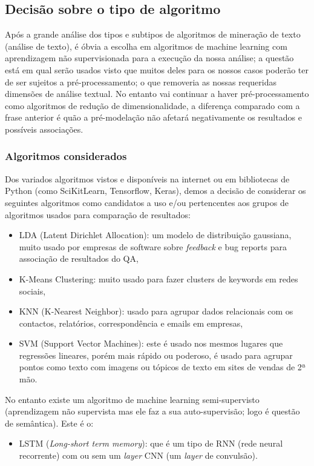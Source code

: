 \documentclass[a4paper,10pt]{article}
\begin{document}
\subsection{Decisão sobre o tipo de algoritmo}

Após a grande análise dos tipos e subtipos de algoritmos de mineração de texto (análise de texto), é óbvia a escolha em algoritmos de machine learning com aprendizagem não supervisionada para a execução da nossa análise; a questão está em qual serão usados visto que muitos deles para os nossos casos poderão ter de ser sujeitos a pré-processamento; o que removeria as nossas requeridas dimensões de análise textual.
No entanto vai continuar a haver pré-processamento como algoritmos de redução de dimensionalidade, a diferença comparado com a frase anterior é quão a pré-modelação não afetará negativamente os resultados e possíveis associações.

\subsubsection{Algoritmos considerados}

Dos variados algoritmos vistos e disponíveis na internet ou em bibliotecas de Python (como SciKitLearn, Tensorflow, Keras), demos a decisão de considerar os seguintes algoritmos como candidatos a uso e/ou pertencentes aos grupos de algoritmos usados para comparação de resultados:
\begin{itemize}
  \item LDA (Latent Dirichlet Allocation): um modelo de distribuição gaussiana, muito usado por empresas de software sobre \textit{feedback} e bug reports para associação de resultados do QA,
  \item K-Means Clustering: muito usado para fazer clusters de keywords em redes sociais,
  \item KNN (K-Nearest Neighbor): usado para agrupar dados relacionais com os contactos, relatórios, correspondência e emails em empresas,
  \item SVM (Support Vector Machines): este é usado nos mesmos lugares que regressões lineares, porém mais rápido ou poderoso, é usado para agrupar pontos como texto com imagens ou tópicos de texto em sites de vendas de 2ª mão.
\end{itemize}

No entanto existe um algoritmo de machine learning semi-supervisto (aprendizagem não supervista mas ele faz a sua auto-supervisão; logo é questão de semântica).
Este é o:
\begin{itemize}
  \item LSTM (\textit{Long-short term memory}): que é um tipo de RNN (rede neural recorrente) com ou sem um \textit{layer} CNN (um \textit{layer} de convulsão).
\end{itemize}
\end{document}
